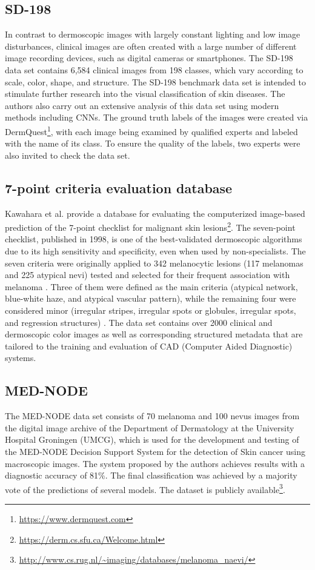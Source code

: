\documentclass[journal]{IEEEtran}
\begin{document}
\subsection{SD-198} \label{subsec_sd198}
In contrast to dermoscopic images with largely constant lighting and low image disturbances, clinical images are often created with a large number of different image recording devices, such as digital cameras or smartphones. The SD-198 data set \cite{sun2016benchmark} contains 6,584 clinical images from 198 classes, which vary according to scale, color, shape, and structure. The SD-198 benchmark data set is intended to stimulate further research into the visual classification of skin diseases. The authors also carry out an extensive analysis of this data set using modern methods including CNNs. The ground truth labels of the images were created via DermQuest\footnote{\url{https://www.dermquest.com}}, with each image being examined by qualified experts and labeled with the name of its class. To ensure the quality of the labels, two experts were also invited to check the data set.

\subsection{7-point criteria evaluation database}
Kawahara et al. \cite{Kawahara2019-7pt} provide a database for evaluating the computerized image-based prediction of the 7-point checklist for malignant skin lesions\footnote{\url{https://derm.cs.sfu.ca/Welcome.html}}. The seven-point checklist, published in 1998, is one of the best-validated dermoscopic algorithms due to its high sensitivity and specificity, even when used by non-specialists. The seven criteria were originally applied to 342 melanocytic lesions (117 melanomas and 225 atypical nevi) tested and selected for their frequent association with melanoma \cite{argenziano1998epiluminescence}. Three of them were defined as the main criteria (atypical network, blue-white haze, and atypical vascular pattern), while the remaining four were considered minor (irregular stripes, irregular spots or globules, irregular spots, and regression structures) \cite{kittler2016standardization}. The data set contains over 2000 clinical and dermoscopic color images as well as corresponding structured metadata that are tailored to the training and evaluation of CAD (Computer Aided Diagnostic) systems.

\subsection{MED-NODE}
The MED-NODE data set \cite{giotis2015med} consists of 70 melanoma and 100 nevus images from the digital image archive of the Department of Dermatology at the University Hospital Groningen (UMCG), which is used for the development and testing of the MED-NODE Decision Support System for the detection of Skin cancer using macroscopic images. The system proposed by the authors achieves results with a diagnostic accuracy of 81\%. The final classification was achieved by a majority vote of the predictions of several models. The dataset is publicly available\footnote{\url{http://www.cs.rug.nl/~imaging/databases/melanoma\_naevi/}}.
\end{document}
